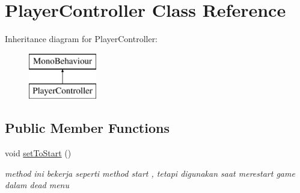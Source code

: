 \hypertarget{class_player_controller}{}\section{Player\+Controller Class Reference}
\label{class_player_controller}
Inheritance diagram for Player\+Controller\+:\begin{figure}[H]
\begin{center}
\leavevmode
\includegraphics[height=2.000000cm]{class_player_controller}
\end{center}
\end{figure}
\subsection*{Public Member Functions}
\begin{DoxyCompactItemize}
\item 
void \hyperlink{class_player_controller_adb52e7f8ab39c74e1922393d5015a70a}{set\+To\+Start} ()
\begin{DoxyCompactList}\small\item\em method ini bekerja seperti method start , tetapi digunakan saat merestart game dalam dead menu \end{DoxyCompactList}\end{DoxyCompactItemize}
